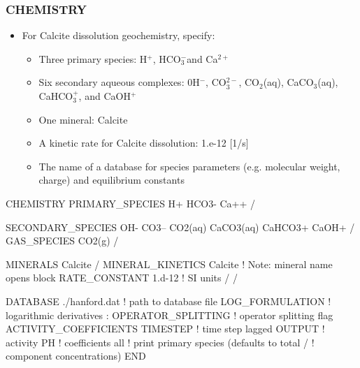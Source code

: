 \documentclass{beamer}
\def\calcium{Ca$^{2+}$}
\def\hion{H$^+$}
\def\hydroxide{0H$^-$}
\def\bicarbonate{HCO$_3^-$}
\def\carbonate{CO$_3^{2-}$}
\def\cotwo{CO$_2$(aq)}
\newcommand\bluecomment[1]{{{\color{blue} #1}}}
\begin{document}
\begin{frame}\frametitle{CHEMISTRY}

\begin{itemize}
\item For Calcite dissolution geochemistry, specify:
  \begin{itemize}
    \item Three primary species: \hion, \bicarbonate and \calcium
    \item Six secondary aqueous complexes: \hydroxide, \carbonate, \cotwo, CaCO$_3$(aq), CaHCO$_3^+$, and CaOH$^+$
    \item One mineral: Calcite
    \item A kinetic rate for Calcite dissolution: 1.e-12 [1/s]
    \item The name of a database for species parameters (e.g. molecular weight, charge) and equilibrium constants
  \end{itemize}
\end{itemize}

\begin{semiverbatim}
CHEMISTRY
  PRIMARY_SPECIES
    H+
    HCO3-
    Ca++
  /
\end{semiverbatim}
\newpage

\begin{semiverbatim}


  SECONDARY_SPECIES
    OH-
    CO3--
    CO2(aq)
    CaCO3(aq)
    CaHCO3+
    CaOH+
  /
  GAS_SPECIES
    CO2(g)
  /
\end{semiverbatim}
\newpage

\begin{semiverbatim}


  MINERALS
    Calcite
  /
  MINERAL_KINETICS
    Calcite       \bluecomment{! Note: mineral name opens block}
      RATE_CONSTANT 1.d-12  \bluecomment{! SI units}
    /
  /
\end{semiverbatim}
\newpage

\begin{semiverbatim}


  DATABASE ./hanford.dat  \bluecomment{! path to database file}
  LOG_FORMULATION         \bluecomment{! logarithmic derivatives}
:  OPERATOR_SPLITTING     \bluecomment{! operator splitting flag}
  ACTIVITY_COEFFICIENTS TIMESTEP  \bluecomment{! time step lagged}
  OUTPUT                          \bluecomment{!   activity}
    PH                            \bluecomment{!   coefficients}
    all   \bluecomment{! print primary species (defaults to total}
  /       \bluecomment{!   component concentrations)}
END

\end{semiverbatim}

\end{frame}
\end{document}
